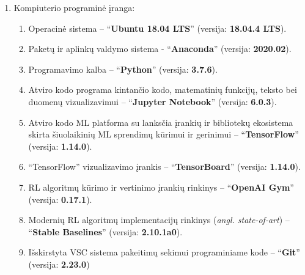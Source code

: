 \documentclass{VUMIFPSbakalaurinis}
\begin{document}
{\begin{enumerate}
		\item Kompiuterio programinė įranga:
		\begin{enumerate}
			\item Operacinė sistema -- \enquote{\textbf{Ubuntu 18.04 LTS}} (versija: \textbf{18.04.4 LTS}).
			\item Paketų ir aplinkų valdymo sistema - \enquote{\textbf{Anaconda}}  (versija: \textbf{2020.02}).
			\item Programavimo kalba -- \enquote{\textbf{Python}} (versija: \textbf{3.7.6}).
			\item Atviro kodo programa kintančio kodo, matematinių funkcijų, teksto bei duomenų vizualizavimui -- \enquote{\textbf{Jupyter Notebook}}  (versija: \textbf{6.0.3}).
			\item Atviro kodo ML platforma su lanksčia įrankių ir bibliotekų ekosistema skirta šiuolaikinių ML sprendimų kūrimui ir gerinimui -- \enquote{\textbf{TensorFlow}} (versija: \textbf{1.14.0}).
			\item \enquote{TensorFlow} vizualizavimo įrankis -- \enquote{\textbf{TensorBoard}} (versija: \textbf{1.14.0}).
			\item RL algoritmų kūrimo ir vertinimo įrankių rinkinys -- \enquote{\textbf{OpenAI Gym}} (versija: \textbf{0.17.1}).
			\item Modernių RL algoritmų implementacijų rinkinys (\textit{angl. state-of-art}) -- \enquote{\textbf{Stable Baselines}} (versija: \textbf{2.10.1a0}).
			\item Išskirstyta VSC sistema pakeitimų sekimui programiniame kode -- \enquote{\textbf{Git}} (versija: \textbf{2.23.0}) 
		\end{enumerate}
	\end{enumerate}
}
\end{document}
